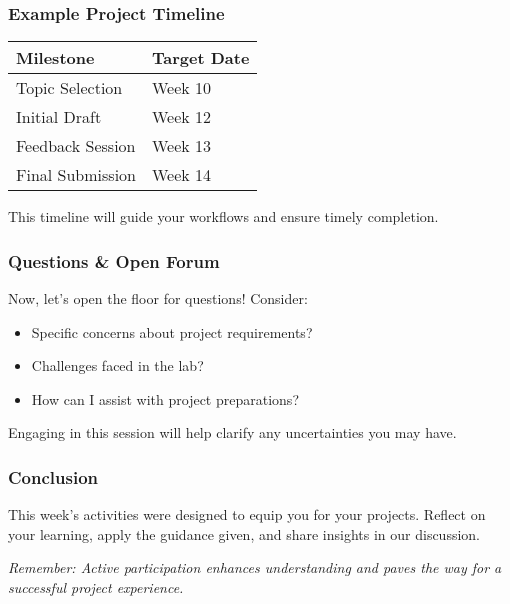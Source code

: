 \documentclass[aspectratio=169]{beamer}
\begin{document}
\begin{frame}[fragile]
    \frametitle{Example Project Timeline}
    \begin{tabular}{|l|l|}
        \hline
        \textbf{Milestone} & \textbf{Target Date} \\
        \hline
        Topic Selection & Week 10 \\
        \hline
        Initial Draft & Week 12 \\
        \hline
        Feedback Session & Week 13 \\
        \hline
        Final Submission & Week 14 \\
        \hline
    \end{tabular}

    \smallskip
    This timeline will guide your workflows and ensure timely completion.
\end{frame}

\begin{frame}[fragile]
    \frametitle{Questions \& Open Forum}
    Now, let's open the floor for questions! Consider:
    \begin{itemize}
        \item Specific concerns about project requirements?
        \item Challenges faced in the lab?
        \item How can I assist with project preparations?
    \end{itemize}

    Engaging in this session will help clarify any uncertainties you may have.
\end{frame}

\begin{frame}[fragile]
    \frametitle{Conclusion}
    This week’s activities were designed to equip you for your projects. Reflect on your learning, apply the guidance given, and share insights in our discussion.

    \textit{Remember: Active participation enhances understanding and paves the way for a successful project experience.}
\end{frame}
\end{document}
